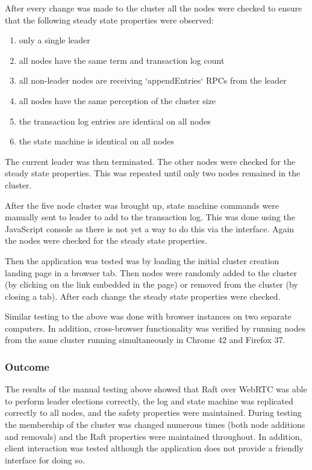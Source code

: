 \documentclass{acmtog} %
\begin{document}
After every change was made to the cluster all the nodes were checked
to ensure that the following steady state properties were observed:
\begin{enumerate}
\item only a single leader
\item all nodes have the same term and transaction log count
\item all non-leader nodes are receiving `appendEntries` RPCs from the leader
\item all nodes have the same perception of the cluster size
\item the transaction log entries are identical on all nodes
\item the state machine is identical on all nodes
\end{enumerate}

The current leader was then terminated. The other nodes were checked
for the steady state properties. This was repeated until only two
nodes remained in the cluster.

After the five node cluster was brought up, state machine commands
were manually sent to leader to add to the transaction log. This was
done using the JavaScript console as there is not yet a way to do this
via the interface. Again the nodes were checked for the steady state
properties.

Then the application was tested was by loading the initial cluster
creation landing page in a browser tab. Then nodes were randomly added
to the cluster (by clicking on the link embedded in the page) or
removed from the cluster (by closing a tab). After each change the
steady state properties were checked.

Similar testing to the above was done with browser instances on two
separate computers. In addition, cross-browser functionality was
verified by running nodes from the same cluster running simultaneously
in Chrome 42 and Firefox 37.


\subsubsection{Outcome}

The results of the manual testing above showed that Raft over WebRTC
was able to perform leader elections correctly, the log and state
machine was replicated correctly to all nodes, and the safety
properties were maintained. During testing the membership of the
cluster was changed numerous times (both node additions and removals)
and the Raft properties were maintained throughout. In addition,
client interaction was tested although the application does not
provide a friendly interface for doing so.
\end{document}
